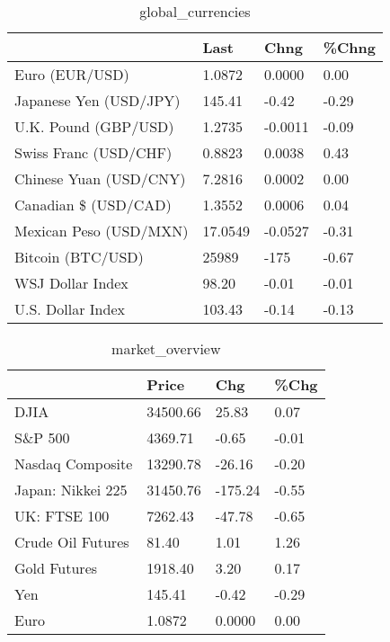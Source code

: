 \documentclass{article}%
\begin{document}
%


\begin{table}[htbp]%
\caption{global\_currencies}%
\centering%
\begin{adjustbox}{width=1\textwidth}%
\begin{tabular}{llll}
\toprule
                       &    Last &    Chng & \%Chng \\
\midrule
        Euro (EUR/USD) &  1.0872 &  0.0000 &  0.00 \\
Japanese Yen (USD/JPY) &  145.41 &   -0.42 & -0.29 \\
  U.K. Pound (GBP/USD) &  1.2735 & -0.0011 & -0.09 \\
 Swiss Franc (USD/CHF) &  0.8823 &  0.0038 &  0.43 \\
Chinese Yuan (USD/CNY) &  7.2816 &  0.0002 &  0.00 \\
  Canadian \$ (USD/CAD) &  1.3552 &  0.0006 &  0.04 \\
Mexican Peso (USD/MXN) & 17.0549 & -0.0527 & -0.31 \\
     Bitcoin (BTC/USD) &   25989 &    -175 & -0.67 \\
      WSJ Dollar Index &   98.20 &   -0.01 & -0.01 \\
     U.S. Dollar Index &  103.43 &   -0.14 & -0.13 \\
\bottomrule
\end{tabular}
%
\end{adjustbox}%
\end{table}

%


\begin{table}[htbp]%
\caption{market\_overview}%
\centering%
\begin{adjustbox}{width=1\textwidth}%
\begin{tabular}{llll}
\toprule
                  &    Price &     Chg &  \%Chg \\
\midrule
             DJIA & 34500.66 &   25.83 &  0.07 \\
          S\&P 500 &  4369.71 &   -0.65 & -0.01 \\
 Nasdaq Composite & 13290.78 &  -26.16 & -0.20 \\
Japan: Nikkei 225 & 31450.76 & -175.24 & -0.55 \\
     UK: FTSE 100 &  7262.43 &  -47.78 & -0.65 \\
Crude Oil Futures &    81.40 &    1.01 &  1.26 \\
     Gold Futures &  1918.40 &    3.20 &  0.17 \\
              Yen &   145.41 &   -0.42 & -0.29 \\
             Euro &   1.0872 &  0.0000 &  0.00 \\
\bottomrule
\end{tabular}
%
\end{adjustbox}%
\end{table}

%
\end{document}
